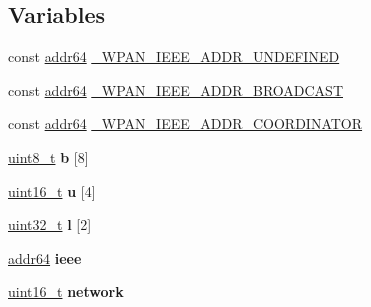 \subsection*{Variables}
\begin{DoxyCompactItemize}
\item 
const \hyperlink{unionaddr64}{addr64} \hyperlink{group__wpan__types_gaaa2d876b00a2f300e24f1077e17dcb76}{\+\_\+\+W\+P\+A\+N\+\_\+\+I\+E\+E\+E\+\_\+\+A\+D\+D\+R\+\_\+\+U\+N\+D\+E\+F\+I\+N\+ED}
\item 
const \hyperlink{unionaddr64}{addr64} \hyperlink{group__wpan__types_ga83c0da7da25848a435da46b80fb70933}{\+\_\+\+W\+P\+A\+N\+\_\+\+I\+E\+E\+E\+\_\+\+A\+D\+D\+R\+\_\+\+B\+R\+O\+A\+D\+C\+A\+ST}
\item 
const \hyperlink{unionaddr64}{addr64} \hyperlink{group__wpan__types_gac6bb0830c58428d2789507a23ab9fcdd}{\+\_\+\+W\+P\+A\+N\+\_\+\+I\+E\+E\+E\+\_\+\+A\+D\+D\+R\+\_\+\+C\+O\+O\+R\+D\+I\+N\+A\+T\+OR}
\item 
\mbox{\label{group__wpan__types_ga4892413ffe70d9782fc226d3512c6cd1}} 
\hyperlink{group__hal__dos_gae1affc9ca37cfb624959c866a73f83c2}{uint8\+\_\+t} {\bfseries b} \mbox{[}8\mbox{]}
\item 
\mbox{\label{group__wpan__types_ga14b257b19e277f41d86cef4c28a5a9b9}} 
\hyperlink{group__hal__dos_ga5a8b2dc9e45a9ee81a94ef304fb62505}{uint16\+\_\+t} {\bfseries u} \mbox{[}4\mbox{]}
\item 
\mbox{\label{group__wpan__types_ga190ad535f282ae870446f52f11bb8e8c}} 
\hyperlink{group__hal__dos_ga09a1e304d66d35dd47daffee9731edaa}{uint32\+\_\+t} {\bfseries l} \mbox{[}2\mbox{]}
\item 
\mbox{\label{group__wpan__types_ga57d831abe873357609a3fce445ac09c0}} 
\hyperlink{unionaddr64}{addr64} {\bfseries ieee}
\item 
\mbox{\label{group__wpan__types_ga8389ac73067c5366c166e34801bf95c4}} 
\hyperlink{group__hal__dos_ga5a8b2dc9e45a9ee81a94ef304fb62505}{uint16\+\_\+t} {\bfseries network}
\end{DoxyCompactItemize}
